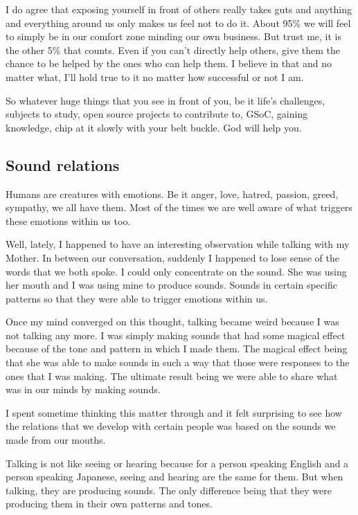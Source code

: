 \documentclass[twoside,11pt]{article}
\begin{document}
I do agree that exposing yourself in front of others really takes guts and anything and everything around us only makes us feel not to do it. About 95\% we will feel to simply be in our comfort zone minding our own business. But trust me, it is the other 5\% that counts. Even if you can't directly help others, give them the chance to be helped by the ones who can help them. I believe in that and no matter what, I'll hold true to it no matter how successful or not I am.

So whatever huge things that you see in front of you, be it life's challenges, subjects to study, open source projects to contribute to, GSoC, gaining knowledge, chip at it slowly with your belt buckle. God will help you.

\newpage
\begin{center}
  \section{Sound relations}
\end{center}
\bigskip
\bigskip
\bigskip

Humans are creatures with emotions. Be it anger, love, hatred, passion, greed, sympathy, we all have them. Most of the times we are well aware of what triggers these emotions within us too.

Well, lately, I happened to have an interesting observation while talking with my Mother. In between our conversation, suddenly I happened to lose sense of the words that we both spoke. I could only concentrate on the sound. She was using her mouth and I was using mine to produce sounds. Sounds in certain specific patterns so that they were able to trigger emotions within us.

Once my mind converged on this thought, talking became weird because I was not talking any more. I was simply making sounds that had some magical effect because of the tone and pattern in which I made them. The magical effect being that she was able to make sounds in such a way that those were responses to the ones that I was making. The ultimate result being we were able to share what was in our minds by making sounds.

I spent sometime thinking this matter through and it felt surprising to see how the relations that we develop with certain people was based on the sounds we made from our mouths.

Talking is not like seeing or hearing because for a person speaking English and a person speaking Japanese, seeing and hearing are the same for them. But when talking, they are producing sounds. The only difference being that they were producing them in their own patterns and tones.
\end{document}
